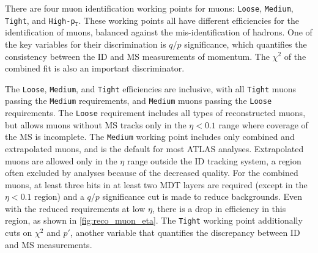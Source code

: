 There are four muon identification working points for muons: \texttt{Loose}, \texttt{Medium}, \texttt{Tight}, and \texttt{High-p$_\texttt{T}$}. These working points all have different efficiencies for the identification of muons, balanced against the mis-identification of hadrons. One of the key variables for their discrimination is $q/p$ significance, which quantifies the consistency between the \ac{ID} and \ac{MS} measurements of momentum. The $\chi^2$ of the combined fit is also an important discriminator. 

The \texttt{Loose}, \texttt{Medium}, and \texttt{Tight} efficiencies are inclusive, with all \texttt{Tight} muons passing the \texttt{Medium} requirements, and \texttt{Medium} muons passing the \texttt{Loose} requirements. The \texttt{Loose} requirement includes all types of reconstructed muons, but allows muons without \ac{MS} tracks only in the $\eta<0.1$ range where coverage of the \ac{MS} is incomplete. The \texttt{Medium} working point includes only combined and extrapolated muons, and is the default for most ATLAS analyses. Extrapolated muons are allowed only in the $\eta$ range outside the \ac{ID} tracking system, a region often excluded by analyses because of the decreased quality. For the combined muons, at least three hits in at least two \ac{MDT} layers are required (except in the $\eta<0.1$ region) and a $q/p$ significance cut is made to reduce backgrounds. Even with the reduced requirements at low $\eta$, there is a drop in efficiency in this region, as shown in \autoref{fig:reco_muon_eta}. The \texttt{Tight} working point additionally cuts on $\chi^2$ and $p'$, another variable that quantifies the discrepancy between \ac{ID} and \ac{MS} \pt measurements. 

